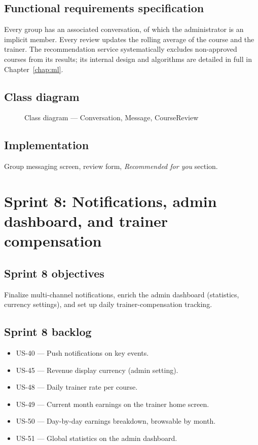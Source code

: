 \documentclass[a4paper,12pt]{report}
\begin{document}
\subsection{Functional requirements specification}
Every group has an associated conversation, of which the administrator is
an implicit member. Every review updates the rolling average of the
course and the trainer. The recommendation service systematically excludes
non-approved courses from its results; its internal design and algorithms
are detailed in full in Chapter~\ref{chap:ml}.

\subsection{Class diagram}
\begin{figure}[H]
\centering
\caption{Class diagram --- Conversation, Message, CourseReview}
\end{figure}

\subsection{Implementation}
Group messaging screen, review form, \emph{Recommended for you} section.

\section{Sprint 8: Notifications, admin dashboard, and trainer compensation}

\subsection{Sprint 8 objectives}
Finalize multi-channel notifications, enrich the admin dashboard
(statistics, currency settings), and set up daily trainer-compensation
tracking.

\subsection{Sprint 8 backlog}
\begin{itemize}[leftmargin=*]
  \item US-40 --- Push notifications on key events.
  \item US-45 --- Revenue display currency (admin setting).
  \item US-48 --- Daily trainer rate per course.
  \item US-49 --- Current month earnings on the trainer home screen.
  \item US-50 --- Day-by-day earnings breakdown, browsable by month.
  \item US-51 --- Global statistics on the admin dashboard.
\end{itemize}
\end{document}
